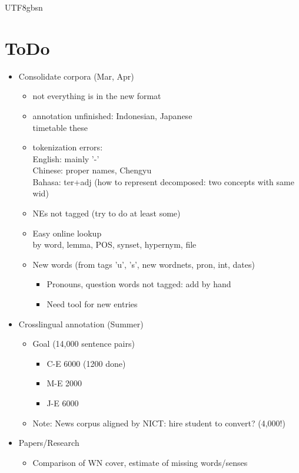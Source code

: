 \documentclass[12pt]{book} %
\begin{document}
\begin{CJK}{UTF8}{gbsn}
\section{ToDo}

\begin{itemize}
\item Consolidate corpora (Mar, Apr)
  \begin{itemize}
  \item not everything is in the new format
  \item annotation unfinished: Indonesian, Japanese
    \\ timetable these
  \item tokenization errors: 
    \\ English: mainly '-'
    \\ Chinese: proper names, Chengyu
    \\ Bahasa: ter+adj (how to represent decomposed: two concepts with same wid)
  \item NEs not tagged (try to do at least some)
  \item Easy online lookup
    \\ by word, lemma, POS, synset, hypernym, file
  \item New words (from tags 'u', 's', new wordnets, pron, int, dates)
    \begin{itemize}
    \item Pronouns, question words not tagged:   add by hand
    \item Need tool for new entries
    \end{itemize}
  \end{itemize}
\item Crosslingual annotation (Summer)
  \begin{itemize}
  \item Goal (14,000 sentence pairs)
    \begin{itemize}
    \item C-E 6000 (1200 done)
    \item M-E 2000
    \item J-E 6000
    \end{itemize}
  \item Note: News corpus aligned by NICT: hire student to convert? (4,000!)
  \end{itemize}
\item Papers/Research
  \begin{itemize}
  \item  Comparison of WN cover, estimate of missing words/senses

\end{itemize}
\end{itemize}
\end{CJK}
\end{document}
